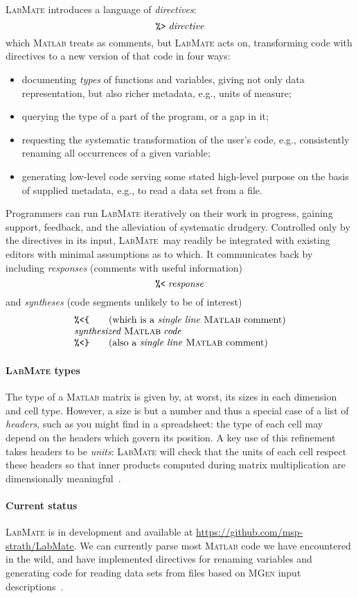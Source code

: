 \documentclass{ws-procs9x6}
\newcommand{\pct}{\texttt{\symbol{37}}}
\newcommand{\dir}{\texttt{\symbol{62}}}
\newcommand{\res}{\texttt{\symbol{60}}}
\newcommand{\lcb}{\texttt{\symbol{123}}}
\newcommand{\rcb}{\texttt{\symbol{125}}}
\newcommand{\lr}{\textsc{LabMate}}
\newcommand{\repo}{\url{https://github.com/msp-strath/LabMate}}
\newcommand{\ma}{\textsc{Matlab}}
\newcommand{\remph}{\emph}
\begin{document}
\lr{} introduces a language of \emph{directives}:
\[\pct\dir\;\mathit{directive}
\]
which \ma{} treats as comments, but \lr{} acts on, transforming code with directives to a new version of that code in four ways:
\begin{itemize}
\item documenting \remph{types} of functions and variables, giving not only data representation, but also richer metadata, e.g., units of measure;
\item querying the type of a part of the program, or a gap in it;
\item requesting the systematic transformation of the user's code, e.g., consistently renaming all occurrences of a given variable;
\item generating low-level code serving some stated high-level purpose on the basis of supplied metadata, e.g., to read a data set from a file.
\end{itemize}
Programmers can run \lr{} iteratively on their work in progress, gaining support, feedback, and the alleviation of systematic drudgery. Controlled only by the directives in its input, \lr\ may readily be integrated with existing editors with minimal assumptions as to which. It communicates back by including \emph{responses} (comments with useful information)
\[
\pct\res\;\mathit{response}
\]
and \emph{syntheses} (code segments unlikely to be of interest)
\[\begin{array}{l}
\pct\res\lcb\qquad \mbox{(which is a \remph{single line} \ma{} comment)}\\
\mathit{synthesized}\; \ma\;\mathit{code}\\
\pct\res\rcb\qquad \mbox{(also a \remph{single line} \ma{} comment)} \\
\end{array}\]

\paragraph{\lr{} types}

The type of a \ma{} matrix is given by, at worst, its sizes in each dimension and cell type. However, a size is but a number and thus a special case of a list of \remph{headers}, such as you might find in a spreadsheet: the type of each cell may depend on the headers which govern its position. A key use of this refinement takes headers to be \remph{units}: \lr{} will check that the units of each cell respect these headers so that inner products computed during matrix multiplication are dimensionally meaningful~\cite{dimTypes}.

\paragraph{Current status}

\lr{} is in development and available at \repo. We can currently parse most \ma{} code we have encountered in the wild, and have implemented directives for renaming variables and generating code for reading data sets from files based on \textsc{MGen} input descriptions~\cite{mgen}.



\end{document}

